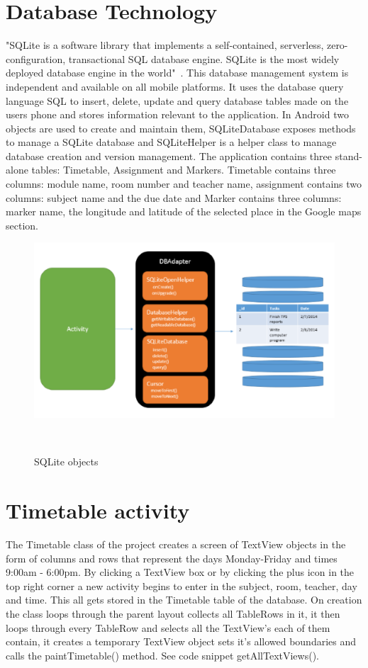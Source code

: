 \clearpage
\section{Database Technology}
"SQLite is a software library that implements a self-contained, serverless, zero-configuration, transactional SQL database engine. SQLite is the most widely deployed database engine in the world"~\cite{sqlite}. This database management system is independent and available on all mobile platforms. It uses the database query language SQL to insert, delete, update and query database tables made on the users phone and stores information relevant to the application. In Android two objects are used to create and maintain them, SQLiteDatabase exposes methods to manage a SQLite database and SQLiteHelper is a helper class to manage database creation and version management. The application contains three stand-alone tables: Timetable, Assignment and Markers. Timetable contains three columns: module name, room number and teacher name, assignment contains two columns: subject name and the due date and Marker contains three columns: marker name, the longitude and latitude of the selected place in the Google maps section.\newline

\begin{figure}[h]
	\includegraphics{img/Android-SQLite-Overview.png}
	\caption{SQLite objects}~\cite{using-the-sqlite-database}
\end{figure}

\section{Timetable activity}
The Timetable class of the project creates a screen of TextView objects in the form of columns and rows that represent the days Monday-Friday and times 9:00am - 6:00pm. By clicking a TextView box or by clicking the plus icon in the top right corner a new activity begins to enter in the subject, room, teacher, day and time. This all gets stored in the Timetable table of the database. On creation the class loops through the parent layout collects all TableRows in it, it then loops through every TableRow and selects all the TextView's each of them contain, it creates a temporary TextView object sets it's allowed boundaries and calls the paintTimetable() method. See code snippet getAllTextViews().

